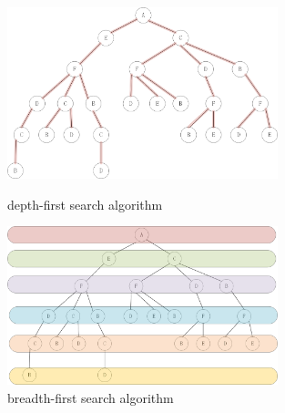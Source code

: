 \documentclass[aps,letterpaper,10pt]{revtex4}
\begin{document}
\begin{figure}
	\begin{minipage}[c]{0.4\textwidth} %
		\centering
		\includegraphics[width=0.7\textwidth]{Q1_visual_DFS.png} %
		\caption{depth-first search algorithm}
	\end{minipage}%
	\begin{minipage}[c]{0.4\textwidth} %
		\centering
		\includegraphics[width=0.7\textwidth]{Q1_visual_BFS.png} %
		\caption{breadth-first search algorithm}
	\end{minipage}%

\end{figure}
\end{document}
